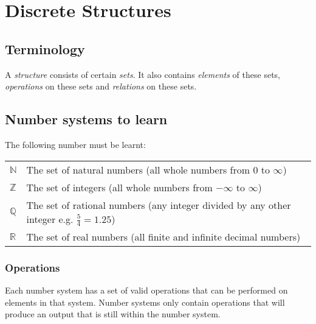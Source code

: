 
\newcommand{\parsetreedot}{\phantom{|}\cdot\phantom{|}}

\section{Discrete Structures}

\subsection{Terminology}

A {\it structure} consists of certain {\it sets}. It also contains {\it
elements} of these sets, {\it operations} on these sets and {\it relations} on
these sets.

\subsection{Number systems to learn}

The following number must be learnt:

\begin{center}
	\begin{tabularx}{\textwidth}{l X}
		$\mathbb{N}$ & The set of natural numbers (all whole numbers from $0$ to $\infty$)\\

		$\mathbb{Z}$ & The set of integers (all whole numbers from $-\infty$ to $\infty$)\\

		$\mathbb{Q}$ & The set of rational numbers (any integer divided by any other integer e.g. $\frac{5}{4}=1.25$)\\

		$\mathbb{R}$ & The set of real numbers (all finite and infinite decimal numbers)\\
	\end{tabularx}
\end{center}

\subsubsection{Operations}

Each number system has a set of valid operations that can be performed on
elements in that system. Number systems only contain operations that will
produce an output that is still within the number system.

